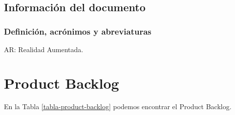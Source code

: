 \subsection{Información del documento}
\subsubsection{Definición, acrónimos y abreviaturas}
AR: Realidad Aumentada.\\


\section{Product Backlog} \label{apendice-product-backlog}

En la Tabla \ref{tabla-product-backlog} podemos encontrar el Product Backlog.


